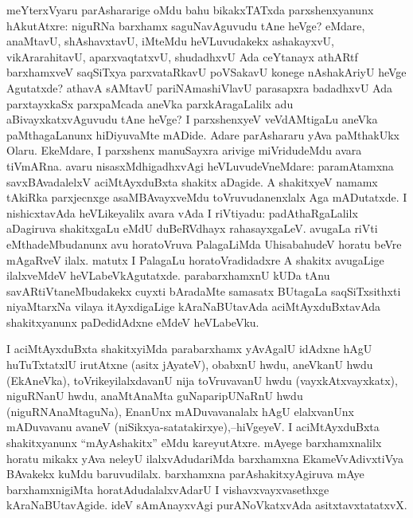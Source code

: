 meYterxVyaru parAshararige oMdu bahu bikakxTATxda parxshenxyanunx hAkutAtxre: niguRNa barxhamx saguNavAguvudu tAne heVge? eMdare, anaMtavU, shAshavxtavU, iMteMdu heVLuvudakekx ashakayxvU, vikArarahitavU, aparxvaqtatxvU, shudadhxvU Ada ceYtanayx athARtf barxhamxveV saqSiTxya parxvataRkavU poVSakavU konege nAshakAriyU heVge Agutatxde? athavA sAMtavU pariNAmashiVlavU parasapxra badadhxvU Ada parxtayxkaSx parxpaMcada aneVka parxkAragaLalilx adu aBivayxkatxvAguvudu tAne heVge? I parxshenxyeV veVdAMtigaLu aneVka paMthagaLanunx hiDiyuvaMte mADide. Adare parAshararu yAva paMthakUkx Olaru. EkeMdare, I parxshenx manuSayxra arivige miVridudeMdu avara tiVmARna. avaru nisasxMdhigadhxvAgi heVLuvudeVneMdare: paramAtamxna savxBAvadalelxV aciMtAyxduBxta shakitx aDagide. A shakitxyeV namamx tAkiRka parxjecnxge asaMBAvayxveMdu toVruvudanenxlalx Aga mADutatxde. I nishicxtavAda heVLikeyalilx avara vAda I riVtiyadu: padAthaRgaLalilx aDagiruva shakitxgaLu eMdU duBeRVdhayx rahasayxgaLeV. avugaLa riVti eMthadeMbudanunx avu horatoVruva PalagaLiMda UhisabahudeV horatu beVre mAgaRveV ilalx. matutx I PalagaLu horatoVradidadxre A shakitx avugaLige ilalxveMdeV heVLabeVkAgutatxde. parabarxhamxnU kUDa tAnu savARtiVtaneMbudakekx cuyxti bAradaMte samasatx BUtagaLa saqSiTxsithxti niyaMtarxNa vilaya itAyxdigaLige kAraNaBUtavAda aciMtAyxduBxtavAda shakitxyanunx paDedidAdxne eMdeV heVLabeVku.

I aciMtAyxduBxta shakitxyiMda parabarxhamx yAvAgalU idAdxne hAgU huTuTxtatxlU irutAtxne (asitx jAyateV), obabxnU hwdu, aneVkanU hwdu (EkAneVka), toVrike\-yilalxdavanU nija toVruvavanU hwdu (vayxkAtxvayxkatx), niguRNanU hwdu, anaMtA\-naMta guNaparipUNaRnU hwdu (niguRNAnaMtaguNa), EnanUnx mADuvavanalalx hAgU elalxvanUnx mADuvavanu avaneV (niSikxya-satatakirxye),--hiVgeyeV. I aciMtAyxduBxta shakitxyanunx ``mAyAshakitx'' eMdu kareyutAtxre. mAyege barxhamxnalilx horatu mikakx yAva neleyU ilalxvAdudariMda barxhamxna EkameVvAdivxtiVya BAvakekx kuMdu baruvudilalx. barxhamxna parAshakitxyAgiruva mAye barxhamxnigiMta horatAdudalalxvAdarU I vishavxvayxvasethxge kAraNaBUtavAgide. ideV sAmAnayxvAgi purANoVkatxvAda asitxtavxtatatxvX.

